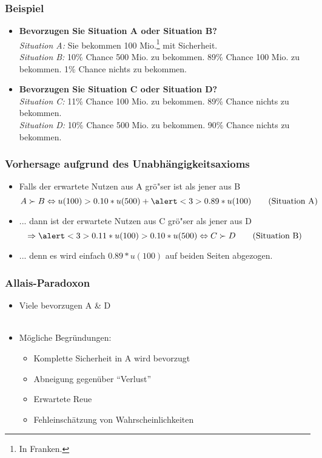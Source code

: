 \documentclass{beamer}
\begin{document}
\begin{frame}
  \frametitle{Beispiel \textcite[S. 527]{allais_paradox}}
    \begin{itemize}

  \item \textbf{Bevorzugen Sie Situation A oder Situation B?}\\
  \textit{Situation A:} Sie bekommen 100 Mio.\footnote{In Franken.} mit Sicherheit.\\
  \textit{Situation B:} 10\% Chance 500 Mio. zu bekommen. 89\% Chance 100 Mio. zu bekommen. 1\% Chance nichts zu bekommen. 
  
\item \textbf{Bevorzugen Sie Situation C oder Situation D?}\\
  \textit{Situation C:} 11\% Chance 100 Mio. zu bekommen. 89\% Chance nichts zu bekommen.\\
  \textit{Situation D:} 10\% Chance 500 Mio. zu bekommen. 90\% Chance nichts zu bekommen.
\end{itemize}

\end{frame}

\begin{frame}
  \frametitle{Vorhersage aufgrund des Unabh\"angigkeitsaxioms}
  \begin{itemize}
  \item<1-> Falls der erwartete Nutzen aus A gr\"o"ser ist als jener aus B \begin{equation}\label{eq:6}
     A \succ  B \Leftrightarrow u(100) > 0.10* u(500) + \alert<3>{0.89* u(100)} \tag{Situation A}
   \end{equation}
   
 \item<2-> ... dann ist der erwartete Nutzen aus C gr\"o"ser als jener aus D \begin{equation}
     \label{eq:7}
   \Rightarrow \alert<3>{0.11*u(100)} > 0.10*u(500) \Leftrightarrow C \succ D \tag{Situation B}
 \end{equation}
 
\item<3-> ... denn es wird einfach $0.89*u(100)$ auf beiden Seiten abgezogen.
  \end{itemize}
\end{frame}

\begin{frame}
  \frametitle{Allais-Paradoxon}
  \begin{itemize}
  \item Viele bevorzugen A \& D\\~\\
  \item<2-> M\"ogliche Begr\"undungen:
    \begin{itemize}
    \item Komplette Sicherheit in A wird bevorzugt
    \item Abneigung gegen\"uber "`Verlust"' 
    \item Erwartete Reue
    \item Fehleinsch\"atzung von Wahrscheinlichkeiten 
    \end{itemize}
  \end{itemize}
\end{frame}
\end{document}
